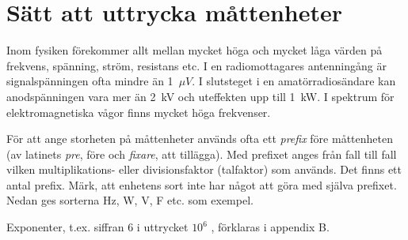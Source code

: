 \chapter{Sätt att uttrycka måttenheter}

  Inom fysiken förekommer allt mellan mycket höga och mycket låga
  värden på frekvens, spänning, ström, resistans etc. I en
  radiomottagares antenningång är signalspänningen ofta mindre än
  1~\(\mu V\). I slutsteget i en amatörradiosändare kan anodspänningen vara
  mer än 2~kV och uteffekten upp till 1~kW. I spektrum för
  elektromagnetiska vågor finns mycket höga frekvenser.

  För att ange storheten på måttenheter används ofta ett \emph{prefix}
  före måttenheten (av latinets \emph{pre}, före och \emph{fixare},
  att tillägga). Med prefixet anges från fall till fall vilken
  multiplikations- eller divisionsfaktor (talfaktor) som används. Det
  finns ett antal prefix. Märk, att enhetens sort inte har något att
  göra med själva prefixet. Nedan ges sorterna Hz, W, V, F etc. som
  exempel.

  Exponenter, t.ex. siffran 6 i uttrycket \(10^6\) , förklaras i appendix B.

